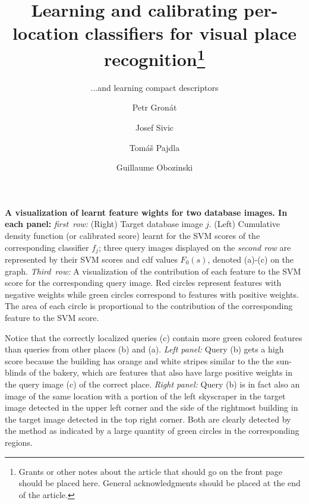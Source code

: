 {
   {\bf  A visualization of learnt feature wights for two database images. In each panel:} 
   \emph{first~row:} (Right) Target database image $j$. (Left) Cumulative density function (or calibrated score) learnt for the SVM scores of the corresponding classifier $f_j$;  three query images displayed on the \emph{second row} are represented by their SVM scores and cdf values $F_0(s)$, denoted (a)-(c) on the graph. \emph{Third~row:} A visualization of the contribution of each feature to the SVM score for the corresponding query image. Red circles represent features with negative weights while green circles correspond to features with positive weights. The area of each circle is proportional to the contribution of the corresponding feature to the SVM score.

   Notice that the correctly localized queries (c) contain more green colored features than queries from other places (b) and (a).
   {\it Left panel:}
   Query (b) gets a high score because the building has orange and white stripes similar to the the sun-blinds of the bakery, which are features that also have large positive weights in the query image (c) of the correct place.
   {\it Right panel:}
   Query (b) is in fact also an image of the same location with a portion of the left skyscraper in the target image detected in the upper left corner and the side of the rightmost building in the target image detected in the top right corner. Both are clearly detected by the method as indicated by a large quantity of green circles in the corresponding regions.
}
\newcommand{\diag}{\mathop{\mathrm{diag}}}

%
%


\title{Learning and calibrating per-location classifiers for visual place recognition\thanks{Grants or other notes
about the article that should go on the front page should be
placed here. General acknowledgments should be placed at the end of the article.}
}
\subtitle{...and learning compact descriptors}


\author{Petr Gron{\'a}t         \and
        Josef {S}ivic          \and
        Tom{\'a}{\v s} Pajdla   \and
        Guillaume Obozinski%
}



